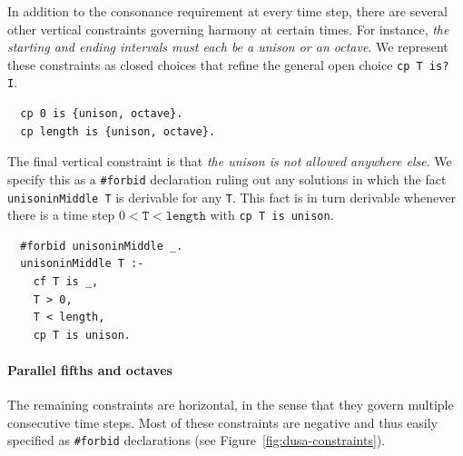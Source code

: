 In addition to the consonance requirement at every time step, there are several other vertical constraints governing harmony at certain times. For instance, \emph{the starting and ending intervals must each be a unison or an octave}. We represent these constraints as closed choices that refine the general open choice \verb|cp T is? I|.

\begin{verbatim}
  cp 0 is {unison, octave}.
  cp length is {unison, octave}.
\end{verbatim}

The final vertical constraint is that \emph{the unison is not allowed anywhere else}. We specify this as a \verb|#forbid| declaration ruling out any solutions in which the fact \verb|unisoninMiddle T| is derivable for any \verb|T|. This fact is in turn derivable whenever there is a time step $0<\mathtt{T}<\mathtt{length}$ with \verb|cp T is unison|.

\begin{verbatim}
  #forbid unisoninMiddle _.
  unisoninMiddle T :-
    cf T is _,
    T > 0,
    T < length,
    cp T is unison.
\end{verbatim}



\paragraph{Parallel fifths and octaves}

The remaining constraints are horizontal, in the sense that they govern multiple consecutive time steps. Most of these constraints are negative and thus easily specified as \verb|#forbid| declarations (see Figure~\ref{fig:dusa-constraints}).


